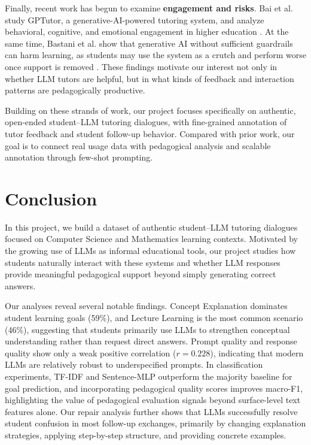Finally, recent work has begun to examine \textbf{engagement and risks}. Bai et al. study GPTutor, a generative-AI-powered tutoring system, and analyze behavioral, cognitive, and emotional engagement in higher education \citep{bai2025promoting}. At the same time, Bastani et al. show that generative AI without sufficient guardrails can harm learning, as students may use the system as a crutch and perform worse once support is removed \citep{bastani2025generative}. These findings motivate our interest not only in whether LLM tutors are helpful, but in what kinds of feedback and interaction patterns are pedagogically productive.

Building on these strands of work, our project focuses specifically on authentic, open-ended student--LLM tutoring dialogues, with fine-grained annotation of tutor feedback and student follow-up behavior. Compared with prior work, our goal is to connect real usage data with pedagogical analysis and scalable annotation through few-shot prompting.

\vspace{-1em}

\section{Conclusion}

In this project, we build a dataset of authentic student--LLM tutoring dialogues focused on Computer Science and Mathematics learning contexts. Motivated by the growing use of LLMs as informal educational tools, our project studies how students naturally interact with these systems and whether LLM responses provide meaningful pedagogical support beyond simply generating correct answers.

Our analyses reveal several notable findings. Concept Explanation dominates student learning goals (59\%), and Lecture Learning is the most common scenario (46\%), suggesting that students primarily use LLMs to strengthen conceptual understanding rather than request direct answers. Prompt quality and response quality show only a weak positive correlation ($r = 0.228$), indicating that modern LLMs are relatively robust to underspecified prompts. In classification experiments, TF-IDF and Sentence-MLP outperform the majority baseline for goal prediction, and incorporating pedagogical quality scores improves macro-F1, highlighting the value of pedagogical evaluation signals beyond surface-level text features alone. Our repair analysis further shows that LLMs successfully resolve student confusion in most follow-up exchanges, primarily by changing explanation strategies, applying step-by-step structure, and providing concrete examples.

